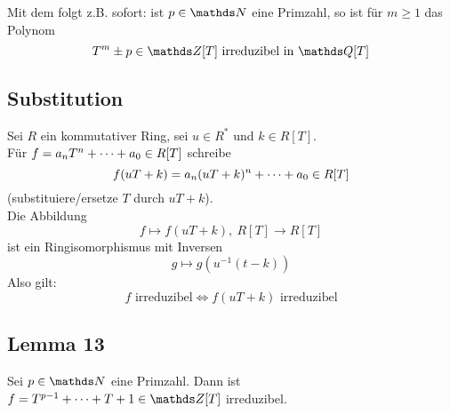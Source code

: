 Mit dem  folgt z.B. sofort: ist $p\in\N$ eine Primzahl, so ist für $m\ge 1$ das Polynom
\[
T^m\pm p\in \Z[T]\text{ irreduzibel in }\Q[T]
\]

\subsection{Substitution}
\label{sub:substitution}
Sei $R$ ein kommutativer Ring, sei $u\in R^*$ und $k\in R[T]$.\\
Für $f=a_nT^n+ \dots +a_0\in R[T]$ schreibe
\[
f(uT+k)=a_n(uT+k)^n+ \dots +a_0\in R[T]
\]
(substituiere/ersetze $T$ durch $uT+k$).\\
Die Abbildung
\[
f\mapsto f(uT+k),~R[T]\to R[T]
\]
ist ein Ringisomorphismus mit Inversen
\[
g\mapsto g(u^{-1}(t-k))
\]
Also gilt:
\[
f\text{ irreduzibel}\Leftrightarrow f(uT+k)\text{ irreduzibel}
\]

\subsection{Lemma 13}
Sei $p\in \N$ eine Primzahl.
Dann ist $f=T^{p-1}\dt{+}T+1\in \Z[T]$ irreduzibel.\\

\\



\cleardoubleoddemptypage
{}
\setcounter{page}{1}




\printindex
\listoffigures
